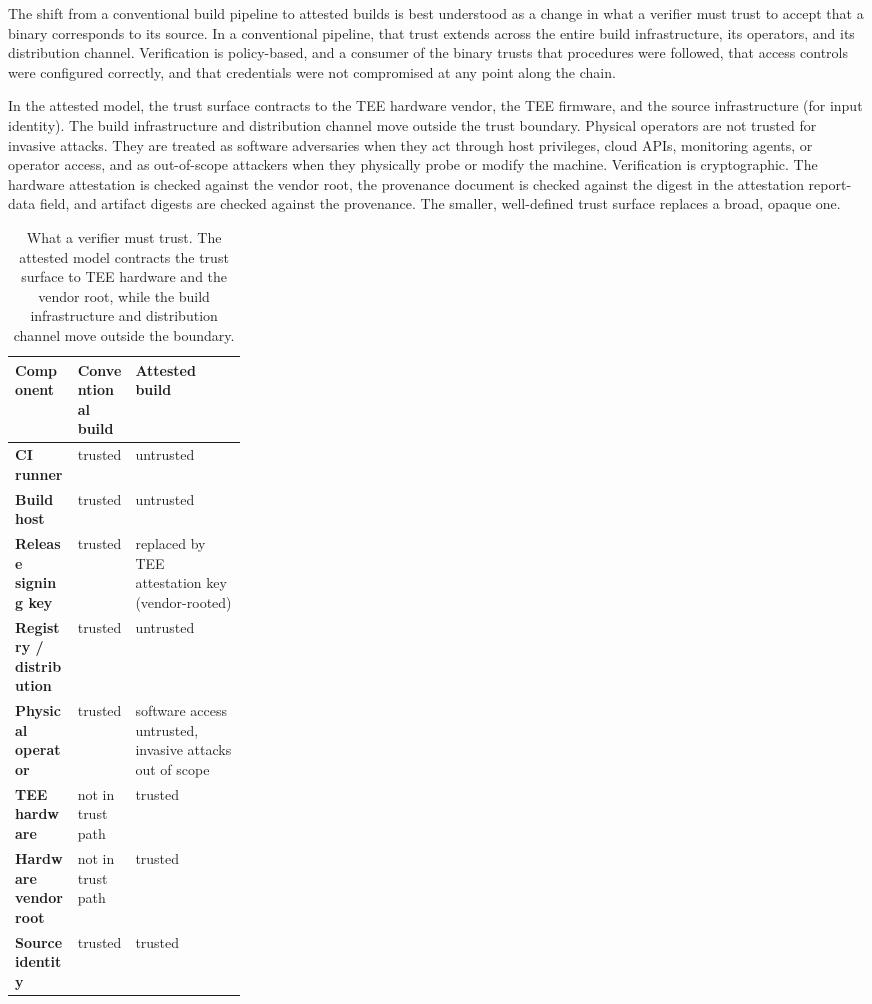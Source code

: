 \documentclass[11pt]{article}
\begin{document}
The shift from a conventional build pipeline to attested builds is best understood as a change in what a verifier must trust to accept that a binary corresponds to its source. In a conventional pipeline, that trust extends across the entire build infrastructure, its operators, and its distribution channel. Verification is policy-based, and a consumer of the binary trusts that procedures were followed, that access controls were configured correctly, and that credentials were not compromised at any point along the chain.

In the attested model, the trust surface contracts to the TEE hardware vendor, the TEE firmware, and the source infrastructure (for input identity). The build infrastructure and distribution channel move outside the trust boundary. Physical operators are not trusted for invasive attacks. They are treated as software adversaries when they act through host privileges, cloud APIs, monitoring agents, or operator access, and as out-of-scope attackers when they physically probe or modify the machine. Verification is cryptographic. The hardware attestation is checked against the vendor root, the provenance document is checked against the digest in the attestation report-data field, and artifact digests are checked against the provenance. The smaller, well-defined trust surface replaces a broad, opaque one.

\begin{table}[H]
\centering
\small
\begin{tabularx}{\linewidth}{@{} >{\bfseries}p{0.27\linewidth} X X @{}}
\toprule
Component & Conventional build & Attested build \\
\midrule
CI runner & trusted & untrusted \\
Build host & trusted & untrusted \\
Release signing key & trusted & replaced by TEE attestation key (vendor-rooted) \\
Registry / distribution & trusted & untrusted \\
Physical operator & trusted & software access untrusted, invasive attacks out of scope \\
TEE hardware & not in trust path & trusted \\
Hardware vendor root & not in trust path & trusted \\
Source identity & trusted & trusted \\
\bottomrule
\end{tabularx}
\caption{What a verifier must trust. The attested model contracts the trust surface to TEE hardware and the vendor root, while the build infrastructure and distribution channel move outside the boundary.}
\end{table}
\end{document}
